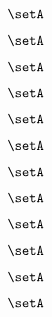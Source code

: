 \begin{forslides}
    \begin{equation}
        \label{eq:slides-translation-137}
        \setA
    \end{equation}

    \begin{equation}
        \label{eq:slides-translation-138}
        \setA
    \end{equation}

    \begin{equation}
        \label{eq:slides-translation-139}
        \setA
    \end{equation}
    
    \begin{equation}
        \label{eq:slides-translation-140}
        \setA
    \end{equation}

    \begin{equation}
        \label{eq:slides-translation-141}
        \setA
    \end{equation}

    \begin{equation}
        \label{eq:slides-translation-142}
        \setA
    \end{equation}

    \begin{equation}
        \label{eq:slides-translation-143}
        \setA
    \end{equation}

    \begin{equation}
        \label{eq:slides-translation-144}
        \setA
    \end{equation}

    \begin{equation}
        \label{eq:slides-translation-145}
        \setA
    \end{equation}

    \begin{equation}
        \label{eq:slides-translation-146}
        \setA
    \end{equation}

    \begin{equation}
        \label{eq:slides-translation-147}
        \setA
    \end{equation}

    \begin{equation}
        \label{eq:slides-translation-148}
        \setA
    \end{equation}


\end{forslides}
